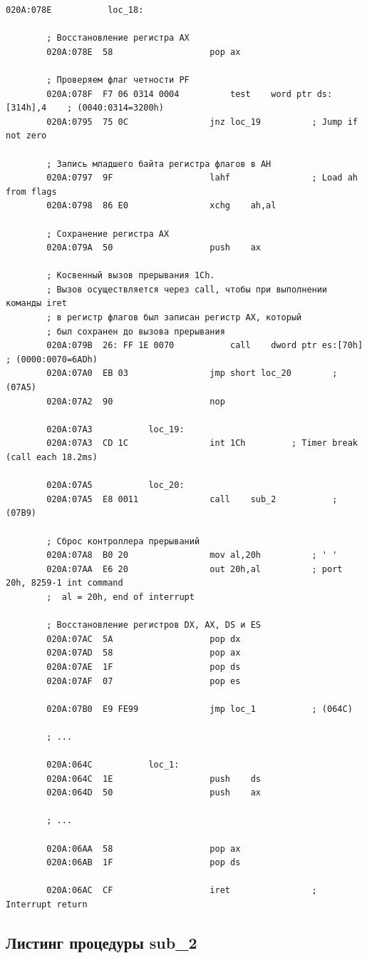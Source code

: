 \documentclass[14pt, a4paper]{article}
\begin{document}
\begin{lstlisting}[style={asm}]
		020A:078E			loc_18:
		
		; Восстановление регистра AX
		020A:078E  58					pop	ax
		
		; Проверяем флаг четности PF
		020A:078F  F7 06 0314 0004			test	word ptr ds:[314h],4	; (0040:0314=3200h)
		020A:0795  75 0C				jnz	loc_19			; Jump if not zero
		
		; Запись младшего байта регистра флагов в AH
		020A:0797  9F					lahf				; Load ah from flags
		020A:0798  86 E0				xchg	ah,al
		
		; Сохранение регистра AX
		020A:079A  50					push	ax
		
		; Косвенный вызов прерывания 1Ch.
		; Вызов осуществляется через call, чтобы при выполнении команды iret
		; в регистр флагов был записан регистр AX, который
		; был сохранен до вызова прерывания
		020A:079B  26: FF 1E 0070			call	dword ptr es:[70h]	; (0000:0070=6ADh)
		020A:07A0  EB 03				jmp	short loc_20		; (07A5)
		020A:07A2  90					nop
		
		020A:07A3			loc_19:
		020A:07A3  CD 1C				int	1Ch			; Timer break (call each 18.2ms)
		
		020A:07A5			loc_20:
		020A:07A5  E8 0011				call	sub_2			; (07B9)
		
		; Сброс контроллера прерываний
		020A:07A8  B0 20				mov	al,20h			; ' '
		020A:07AA  E6 20				out	20h,al			; port 20h, 8259-1 int command
		;  al = 20h, end of interrupt
		
		; Восстановление регистров DX, AX, DS и ES
		020A:07AC  5A					pop	dx
		020A:07AD  58					pop	ax
		020A:07AE  1F					pop	ds
		020A:07AF  07					pop	es
		
		020A:07B0  E9 FE99				jmp	loc_1			; (064C)
		
		; ...
		
		020A:064C			loc_1:
		020A:064C  1E					push	ds
		020A:064D  50					push	ax
		
		; ...
		
		020A:06AA  58					pop	ax
		020A:06AB  1F					pop	ds
		
		020A:06AC  CF					iret				; Interrupt return
	\end{lstlisting}
	
	\subsection*{Листинг процедуры sub\_2}
	
\end{document}
